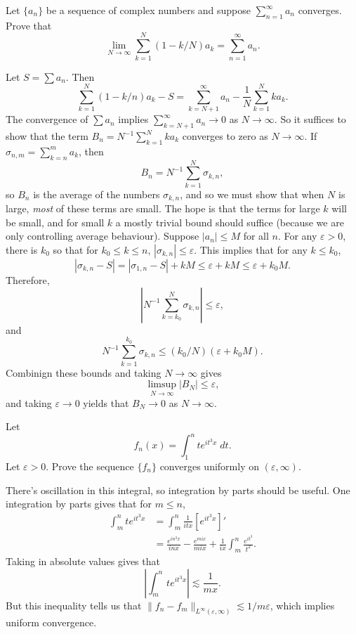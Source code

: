 \documentclass[answers]{exam}
\begin{document}
\begin{questions}
\question Let $\{ a_n \}$ be a sequence of complex numbers and suppose $\sum_{n = 1}^\infty a_n$ converges. Prove that
%
\[ \lim_{N \to \infty} \sum_{k = 1}^N (1 - k/N) a_k = \sum_{n = 1}^\infty a_n. \]
\begin{solution}
	Let $S = \sum a_n$. Then
	\[ \sum_{k = 1}^N (1 - k/n) a_k - S = \sum_{k = N+1}^\infty a_n - \frac{1}{N} \sum_{k = 1}^N k a_k. \]
	The convergence of $\sum a_n$ implies $\sum_{k = N+1}^\infty a_n \to 0$ as $N \to \infty$. So it suffices to show that the term $B_n = N^{-1} \sum_{k = 1}^N k a_k$ converges to zero as $N \to \infty$. If $\sigma_{n,m} = \sum_{k = n}^m a_k$, then
	\[ B_n = N^{-1} \sum_{k = 1}^N \sigma_{k,n}, \]
	so $B_n$ is the average of the numbers $\sigma_{k,n}$, and so we must show that when $N$ is large, \emph{most} of these terms are small. The hope is that the terms for large $k$ will be small, and for small $k$ a mostly trivial bound should suffice (because we are only controlling average behaviour). Suppose $|a_n| \leq M$ for all $n$. For any $\varepsilon > 0$, there is $k_0$ so that for $k_0 \leq k \leq n$, $|\sigma_{k,n}| \leq \varepsilon$. This implies that for any $k \leq k_0$,
	\[ |\sigma_{k,n} - S| = |\sigma_{1,n} - S| + k M \leq \varepsilon + k M \leq \varepsilon + k_0 M. \]
	Therefore,
	\[ |N^{-1} \sum_{k = k_0}^N \sigma_{k,n}| \leq \varepsilon, \]
	and
	\[ N^{-1} \sum_{k = 1}^{k_0} \sigma_{k,n} \leq (k_0/N) (\varepsilon + k_0 M). \]
	Combinign these bounds and taking $N \to \infty$ gives
	\[ \limsup_{N \to \infty} |B_N| \leq \varepsilon, \]
	and taking $\varepsilon \to 0$ yields that $B_N \to 0$ as $N \to \infty$.
\end{solution}

\question Let
%
\[ f_n(x) = \int_1^n t e^{it^3 x}\; dt. \]
%
Let $\varepsilon > 0$. Prove the sequence $\{ f_n \}$ converges uniformly on $(\varepsilon,\infty)$.
\begin{solution}
	There's oscillation in this integral, so integration by parts should be useful. One integration by parts gives that for $m \leq n$,
	\begin{align*}
		\int_m^n t e^{i t^3 x} &= \int_m^n \frac{1}{itx} [ e^{it^3 x} ]'\\
		&= \frac{e^{in^3 x}}{inx} - \frac{e^{mix}}{mix} + \frac{1}{ix} \int_m^n \frac{e^{it^3}}{t^2}.
	\end{align*}
	Taking in absolute values gives that
	\[ \left| \int_m^n t e^{it^3 x} \right| \lesssim \frac{1}{mx}. \]
	But this inequality tells us that $\| f_n - f_m \|_{L^\infty(\varepsilon,\infty)} \lesssim 1/m \varepsilon$, which implies uniform convergence.
\end{solution}


\end{questions}
\end{document}
